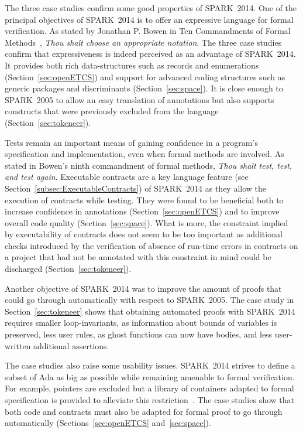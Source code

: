 \documentclass[10pt,a4paper,twocolumn]{article}
\newcommand{\oldspark}{SPARK~2005\xspace}
\newcommand{\newspark}{SPARK~2014\xspace}
\begin{document}
The three case studies confirm some good properties of \newspark.  One
of the principal objectives of \newspark is to offer an expressive
language for formal verification. As stated by Jonathan P. Bowen in
Ten Commandments of Formal Methods~\cite{bowen1995ten}, \emph{Thou
  shalt choose an appropriate notation}. The three case studies
confirm that expressiveness is indeed perceived as an advantage of
\newspark. It provides both rich data-structures such as records and
enumerations (Section~\ref{sec:openETCS}) and support for advanced
coding structures such as generic packages and discriminants
(Section~\ref{sec:space}). It is close enough to \oldspark to allow an
easy translation of annotations but also supports constructs that were
previously excluded from the language (Section~\ref{sec:tokeneer}).

Tests remain an important means of gaining confidence in a program's
specification and implementation, even when formal methods are
involved. As stated in Bowen's ninth commandment of formal methods,
\emph{Thou shalt test, test, and test again}. Executable contracts are
a key language feature (see Section~\ref{subsec:ExecutableContracts})
of \newspark as they allow the execution of contracts while testing. They
were found to be beneficial both to increase confidence in annotations
(Section~\ref{sec:openETCS}) and to improve overall code quality
(Section~\ref{sec:space}). What is more, the constraint implied by
executability of contracts does not seem to be too important as
additional checks introduced by the verification of absence of
run-time errors in contracts on a project that had not be annotated
with this constraint in mind could be discharged
(Section~\ref{sec:tokeneer}).

Another objective of \newspark was to improve the amount of proofs
that could go through automatically with respect to \oldspark. The
case study in Section~\ref{sec:tokeneer} shows that obtaining
automated proofs with \newspark requires smaller loop-invariants, as
information about bounds of variables is preserved, less user rules,
as ghost functions can now have bodies, and less user-written
additional assertions.

The case studies also raise some usability issues. \newspark strives
to define a subset of Ada as big as possible while remaining amenable
to formal verification. For example, pointers are excluded but a
library of containers adapted to formal specification is provided to
alleviate this restriction~\cite{dross2011correct}. The case studies
show that both code and contracts must also be adapted for formal
proof to go through automatically (Sections~\ref{sec:openETCS}
and~\ref{sec:space}).
\end{document}
